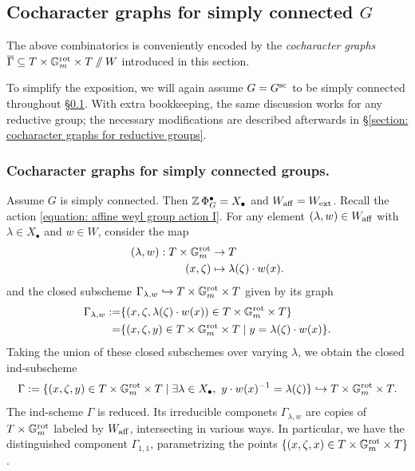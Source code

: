 \subsection{Cocharacter graphs for simply connected \texorpdfstring{$G$}{G}}\label{section: cocharacter graphs}
The above combinatorics is conveniently encoded by the \textit{cocharacter graphs} $\overline{\Gamma} \subseteq T \times \Gm^{\rot} \times T \sslash W$ introduced in this section. 

To simplify the exposition, we will again assume $G =G^{\sc}$ to be simply connected throughout \S \ref{section: cocharacter graphs}. With extra bookkeeping, the same discussion works for any reductive group; the necessary modifications are described afterwards in \S \ref{section: cocharacter graphs for reductive groups}.


\subsubsection{Cocharacter graphs for simply connected groups.}\label{subsubsection: cocharacter graphs for simply connected groups}
Assume $G$ is simply connected. Then $\Z\Phi^{\bullet}_G = X_{\bullet}$ and $W_{\aff} = W_{\ext}$. Recall the action \eqref{equation: affine weyl group action I}. For any element $(\lambda, w) \in W_{\aff}$ with $\lambda \in X_{\bullet}$ and $w \in W$, consider the map
\begin{align*}
    (\lambda, w): T \times \Gm^{\rot} &\to T \\
    (x, \zeta) &\mapsto  \lambda(\zeta) \cdot w(x).
\end{align*}
and the closed subscheme $\Gamma_{\lambda, w} \hookrightarrow T \times \Gm^{\rot} \times T$ given by its graph
\begin{align*}
    \Gamma_{\lambda, w} 
    := &\{ (x, \zeta, \lambda(\zeta) \cdot w(x)) \in T \times \Gm^{\rot} \times T \} \\
    = &\{ (x, \zeta, y) \in T \times \Gm^{\rot} \times T \mid y = \lambda(\zeta) \cdot w(x) \}.
\end{align*}
Taking the union of these closed subschemes over varying $\lambda$, we obtain the closed ind-subscheme
\begin{equation*}
    \Gamma := \{ (x, \zeta, y) \in T \times \Gm^{\rot} \times T \mid \exists \lambda \in X_{\bullet}, \ y \cdot w(x)^{-1} = \lambda(\zeta) \} \hookrightarrow T \times \Gm^{\rot} \times T.
\end{equation*}
The ind-scheme $\Gamma$ is reduced. Its irreducible componets $\Gamma_{\lambda, w}$ are copies of $T \times \Gm^{\rot}$ labeled by $W_{\aff}$, intersecting in various ways. In particular, we have the distinguished component $\Gamma_{1, 1}$, parametrizing the points $\{ (x, \zeta, x) \in T \times \Gm^{\rot} \times T\}$.


